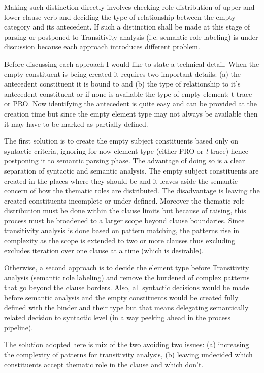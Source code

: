 Making such distinction directly involves checking role distribution of upper and lower clause verb and deciding the type of relationship between the empty category and its antecedent. If such a distinction shall be made at this stage of parsing or postponed to Transitivity analysis (i.e. semantic role labeling) is
under discussion because each approach introduces different problem. 

Before discussing each approach I would like to state a technical detail. When the empty constituent is being created it requires two important details: (a) the antecedent constituent it is bound to and (b) the type of relationship to it's antecedent constituent or if none is available the type of empty element: t-trace or PRO. Now identifying the antecedent is quite easy and can be provided at the creation time but since the empty element type may not always be available then it may have to be marked as partially defined.

The first solution is to create the empty subject constituents based only on syntactic criteria, ignoring for now element type (either PRO or \textit{t}-trace) hence postponing it to semantic parsing phase. The advantage of doing so is a clear separation of syntactic and semantic analysis. The empty subject constituents are created in the places where they should be and it leaves aside the semantic concern of how the thematic roles are distributed. The disadvantage is leaving the created constituents incomplete or under-defined. Moreover the thematic role distribution must be done within the clause limits but because of raising, this process must be broadened to a larger scope beyond clause boundaries. Since transitivity analysis is done based on pattern matching, the patterns rise in complexity as the scope is extended to two or more clauses thus excluding excludes iteration over one clause at a time (which is desirable). 

Otherwise, a second approach is to decide the element type before Transitivity analysis (semantic role labeling) and remove the burdened of complex patterns that go beyond the clause borders. Also, all syntactic decisions would be made before semantic analysis and the empty constituents would be created fully defined with the binder and their type but that means delegating semantically related decision to syntactic level (in a way peeking ahead in the process pipeline).

The solution adopted here is mix of the two avoiding two issues: (a) increasing the complexity of patterns for transitivity analysis, (b) leaving undecided which constituents accept thematic role in the clause and which don't. 

